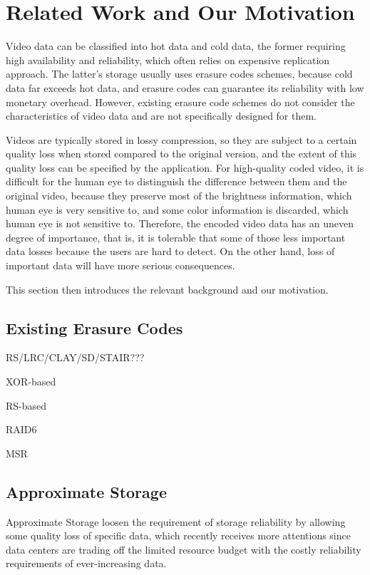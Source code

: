 \documentclass[conference]{IEEEtran}
\begin{document}
\section{Related Work and Our Motivation}
Video data can be classified into hot data and cold data, the former requiring high availability and reliability, which often relies on expensive replication approach. The latter's storage usually uses erasure codes schemes, because cold data far exceeds hot data, and erasure codes can guarantee its reliability with low monetary overhead. However, existing erasure code schemes do not consider the characteristics of video data and are not specifically designed for them.

Videos are typically stored in lossy compression, so they are subject to a certain quality loss when stored compared to the original version, and the extent of this quality loss can be specified by the application. For high-quality coded video, it is difficult for the human eye to distinguish the difference between them and the original video, because they preserve most of the brightness information, which human eye is very sensitive to, and some color information is discarded, which human eye is not sensitive to. Therefore, the encoded video data has an uneven degree of importance, that is, it is tolerable that some of those less important data losses because the users are hard to detect. On the other hand, loss of important data will have more serious consequences.

This section then introduces the relevant background and our motivation.

\subsection{Existing Erasure Codes}
RS/LRC/CLAY/SD/STAIR???

XOR-based

RS-based

RAID6

MSR

\subsection{Approximate Storage}
Approximate Storage loosen the requirement of storage reliability by allowing some quality loss of specific data, which recently receives more attentions since data centers are trading off the limited resource budget with the costly reliability requirements of ever-increasing data.
\end{document}
